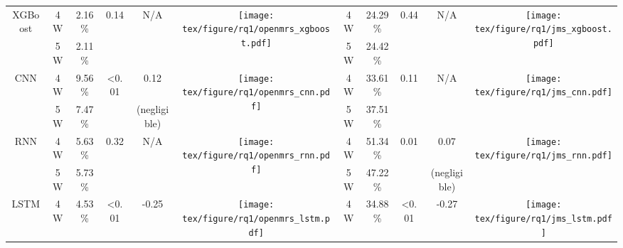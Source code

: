 \begin{landscape}
\begin{table*}[htbp]
{\begin{tabular}{|c|c|c|c|c|c|c|c|c|c|c|}
    \hline
    \multirow{2}[9]{*}{XGBoost} & \multirow{1}[5]{*}{4W}    & \multirow{1}[5]{*}{2.16\%} & \multirow{2}[9]{*}{0.14} & \multirow{2}[9]{*}{N/A} & \multirow{2}[4]{*}{\texttt{[image: tex/figure/rq1/openmrs\_xgboost.pdf]}} & \multirow{1}[5]{*}{4W}    & \multirow{1}[5]{*}{24.29\%} & \multirow{2}[9]{*}{0.44} & \multirow{2}[9]{*}{N/A} & \multirow{2}[4]{*}{\texttt{[image: tex/figure/rq1/jms\_xgboost.pdf]}} \\[4.5mm]
\cline{2-3}\cline{7-8}          & \multirow{1}[5]{*}{5W}    & \multirow{1}[5]{*}{2.11\%} &       &       &       & \multirow{1}[5]{*}{5W}    & \multirow{1}[5]{*}{24.42\%} &       &       &  \\[4.5mm]
    \hline
    \multirow{2}[9]{*}{CNN} & \multirow{1}[5]{*}{4W}    & \multirow{1}[5]{*}{9.56\%} & \multirow{2}[9]{*}{\textless 0.01} & \multirow{1}[10]{*}{0.12} & \multirow{2}[4]{*}{\texttt{[image: tex/figure/rq1/openmrs\_cnn.pdf]}} & \multirow{1}[5]{*}{4W}    & \multirow{1}[5]{*}{33.61\%} & \multirow{2}[9]{*}{0.11} & \multicolumn{1}{c|}{\multirow{2}[9]{*}{N/A}} & \multirow{2}[4]{*}{\texttt{[image: tex/figure/rq1/jms\_cnn.pdf]}} \\[4.5mm]
\cline{2-3}\cline{7-8}          & \multirow{1}[5]{*}{5W}    & \multirow{1}[5]{*}{7.47\%} &       & (negligible) &       & \multirow{1}[5]{*}{5W}    & \multirow{1}[5]{*}{37.51\%} &       &       &  \\[4.5mm]
    \hline
    \multirow{2}[9]{*}{RNN} & \multirow{1}[5]{*}{4W}    & \multirow{1}[5]{*}{5.63\%} & \multirow{2}[9]{*}{0.32} & \multirow{2}[9]{*}{N/A} & \multirow{2}[4]{*}{\texttt{[image: tex/figure/rq1/openmrs\_rnn.pdf]}} & \multirow{1}[5]{*}{4W}    & \multirow{1}[5]{*}{51.34\%} & \multirow{2}[9]{*}{0.01} & \multirow{1}[10]{*}{0.07} & \multirow{2}[4]{*}{\texttt{[image: tex/figure/rq1/jms\_rnn.pdf]}} \\[4.5mm]
\cline{2-3}\cline{7-8}          & \multirow{1}[5]{*}{5W}    & \multirow{1}[5]{*}{5.73\%} &       &       &       & \multirow{1}[5]{*}{5W}    & \multirow{1}[5]{*}{47.22\%} &       & (negligible) &  \\[4.5mm]
    \hline
    \multirow{2}[9]{*}{LSTM} & \multirow{1}[5]{*}{4W}    &\multirow{1}[5]{*}{ 4.53\%} & \multirow{2}[9]{*}{\textless 0.01} & \multirow{1}[10]{*}{-0.25} & \multirow{2}[4]{*}{\texttt{[image: tex/figure/rq1/openmrs\_lstm.pdf]}} & \multirow{1}[5]{*}{4W}    & \multirow{1}[5]{*}{34.88\%} & \multirow{2}[9]{*}{\textless 0.01} & \multirow{1}[10]{*}{-0.27} & \multirow{2}[4]{*}{\texttt{[image: tex/figure/rq1/jms\_lstm.pdf]}} \\[4.5mm]

\end{tabular}}
\end{table*}
\end{landscape}
